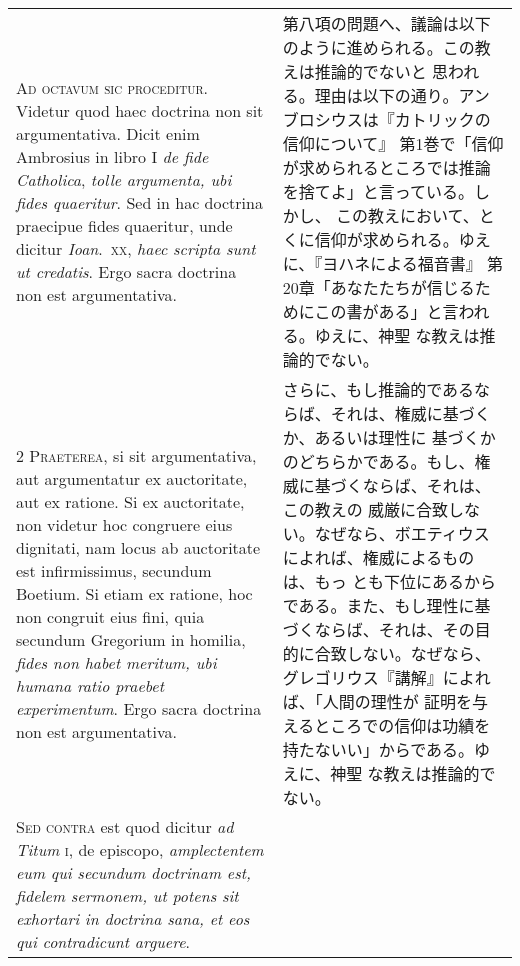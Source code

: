 \documentclass[10pt]{jsarticle}
\begin{document}
\begin{longtable}{p{21em}p{21em}}

{\Huge A}{\scshape d octavum sic proceditur}. Videtur quod haec
doctrina non sit argumentativa. Dicit enim Ambrosius in libro I
{\itshape de fide Catholica}, {\itshape tolle argumenta, ubi fides
quaeritur}. Sed in hac doctrina praecipue fides quaeritur, unde
dicitur {\itshape Ioan}.~{\scshape xx}, {\itshape haec scripta sunt ut
credatis}. Ergo sacra doctrina non est argumentativa.


&

第八項の問題へ、議論は以下のように進められる。この教えは推論的でないと
思われる。理由は以下の通り。アンブロシウスは『カトリックの信仰について』
第1巻で「信仰が求められるところでは推論を捨てよ」と言っている。しかし、
この教えにおいて、とくに信仰が求められる。ゆえに、『ヨハネによる福音書』
第20章「あなたたちが信じるためにこの書がある」と言われる。ゆえに、神聖
な教えは推論的でない。


\\


{\scshape 2 Praeterea}, si sit argumentativa, aut argumentatur ex
auctoritate, aut ex ratione. Si ex auctoritate, non videtur hoc
congruere eius dignitati, nam locus ab auctoritate est infirmissimus,
secundum Boetium. Si etiam ex ratione, hoc non congruit eius fini,
quia secundum Gregorium in homilia, {\itshape fides non habet meritum,
ubi humana ratio praebet experimentum}. Ergo sacra doctrina non est
argumentativa.


&

さらに、もし推論的であるならば、それは、権威に基づくか、あるいは理性に
基づくかのどちらかである。もし、権威に基づくならば、それは、この教えの
威厳に合致しない。なぜなら、ボエティウスによれば、権威によるものは、もっ
とも下位にあるからである。また、もし理性に基づくならば、それは、その目
的に合致しない。なぜなら、グレゴリウス『講解』によれば、「人間の理性が
証明を与えるところでの信仰は功績を持たないい」からである。ゆえに、神聖
な教えは推論的でない。


\\


{\scshape Sed contra} est quod dicitur {\itshape ad Titum} {\scshape
i}, de episcopo, {\itshape amplectentem eum qui secundum doctrinam
est, fidelem sermonem, ut potens sit exhortari in doctrina sana, et
eos qui contradicunt arguere}.


&


\end{longtable}
\end{document}
